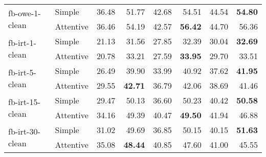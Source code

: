 \begin{tabular}{| l | l | r | r | r | r | r | r |}
    \multirow{2}{*}{fb-owe-1-clean}
    & Simple    & 36.48 & 51.77 & 42.68 & 54.51 & 44.54 & \textbf{54.80} \\
    & Attentive & 36.46 & 54.19 & 42.57 & \textbf{56.42} & 44.70 & 56.36 \\ \hline

    \multirow{2}{*}{fb-irt-1-clean}
    & Simple    & 21.13 & 31.56 & 27.85 & 32.39 & 30.04 & \textbf{32.69} \\
    & Attentive & 20.78 & 33.21 & 27.59 & \textbf{33.95} & 29.70 & 33.51 \\ \hline

    \multirow{2}{*}{fb-irt-5-clean}
    & Simple    & 26.49 & 39.90 & 33.99 & 40.92 & 37.62 & \textbf{41.95} \\
    & Attentive & 29.55 & \textbf{42.71} & 36.79 & 42.06 & 38.69 & 41.46 \\ \hline

    \multirow{2}{*}{fb-irt-15-clean}
    & Simple    & 29.47 & 50.13 & 36.60 & 50.23 & 40.42 & \textbf{50.58} \\
    & Attentive & 34.16 & 49.39 & 40.47 & \textbf{49.50} & 41.94 & 46.88 \\ \hline

    \multirow{2}{*}{fb-irt-30-clean}
    & Simple    & 31.02 & 49.69 & 36.85 & 50.15 & 40.15 & \textbf{51.63} \\
    & Attentive & 35.08 & \textbf{48.44} & 40.85 & 47.60 & 41.00 & 45.55 \\ \hline

\end{tabular}
